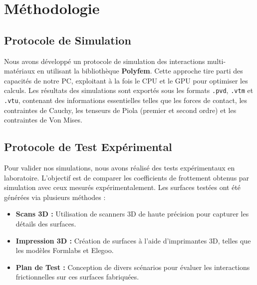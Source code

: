 \chapter{Méthodologie}

\section{Protocole de Simulation}
Nous avons développé un protocole de simulation des interactions multi-matériaux en utilisant la bibliothèque \textbf{Polyfem}. Cette approche tire parti des capacités de notre PC, exploitant à la fois le CPU et le GPU pour optimiser les calculs. Les résultats des simulations sont exportés sous les formats \texttt{.pvd}, \texttt{.vtm} et \texttt{.vtu}, contenant des informations essentielles telles que les forces de contact, les contraintes de Cauchy, les tenseurs de Piola (premier et second ordre) et les contraintes de Von Mises.

\section{Protocole de Test Expérimental}
Pour valider nos simulations, nous avons réalisé des tests expérimentaux en laboratoire. L'objectif est de comparer les coefficients de frottement obtenus par simulation avec ceux mesurés expérimentalement. Les surfaces testées ont été générées via plusieurs méthodes :
\begin{itemize}
    \item \textbf{Scans 3D :} Utilisation de scanners 3D de haute précision pour capturer les détails des surfaces.
    \item \textbf{Impression 3D :} Création de surfaces à l'aide d'imprimantes 3D, telles que les modèles Formlabs et Elegoo.
    \item \textbf{Plan de Test :} Conception de divers scénarios pour évaluer les interactions frictionnelles sur ces surfaces fabriquées.
\end{itemize}

